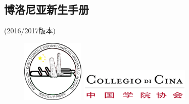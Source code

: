 \documentclass[3pt,a5paper,openright,twoside]{book}
\begin{document}
% 
%
%
%


% 
%
%
%



\begin{titlepage}                  

\topmargin=-2cm 

\chapter*{博洛尼亚新生手册}                 %
\pagestyle{empty}%
\thispagestyle{empty} 
	\begin{center}
	(2016/2017版本)
	\end{center}

\vspace*{0.5cm}

\begin{figure}[H]
  \centering
  \begin{minipage}[b]{0.4\textwidth}
    \includegraphics[width=3cm]{figures/asscubo.png}
  \end{minipage}
  \hfill
  \begin{minipage}[b]{0.4\textwidth}
    \includegraphics[width=\textwidth]{figures/logo.png}
  \end{minipage}
\end{figure}


\end{titlepage}
\end{document}
